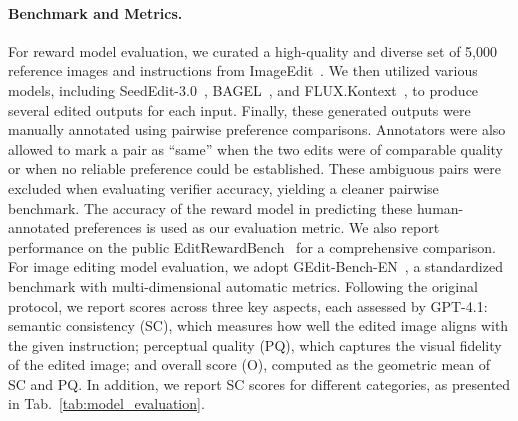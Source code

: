 \paragraph{Benchmark and Metrics.}
For reward model evaluation, we curated a high-quality and diverse set of 5,000 reference images and instructions from ImageEdit~\citep{ye2025imgedit}. 
We then utilized various models, including SeedEdit-3.0~\citep{wang2025seededit}, BAGEL~\citep{deng2025emerging}, and FLUX.Kontext~\citep{batifol2025flux}, to produce several edited outputs for each input. Finally, these generated outputs were manually annotated using pairwise preference comparisons. 
Annotators were also allowed to mark a pair as ``same'' when the two edits were of comparable quality or when no reliable preference could be established. These ambiguous pairs were excluded when evaluating verifier accuracy, yielding a cleaner pairwise benchmark.
The accuracy of the reward model in predicting these human-annotated preferences is used as our evaluation metric. We also report performance on the public EditRewardBench~\citep{luo2025editscore} for a comprehensive comparison.
For image editing model evaluation, we adopt GEdit-Bench-EN~\citep{liu2025step1x}, a standardized benchmark with multi-dimensional automatic metrics. Following the original protocol, we report scores across three key aspects, each assessed by GPT-4.1: semantic consistency (SC), which measures how well the edited image aligns with the given instruction; perceptual quality (PQ), which captures the visual fidelity of the edited image; and overall score (O), computed as the geometric mean of SC and PQ. In addition, we report SC scores for different categories, as presented in Tab.~\ref{tab:model_evaluation}.
\vspace{-.8em}



